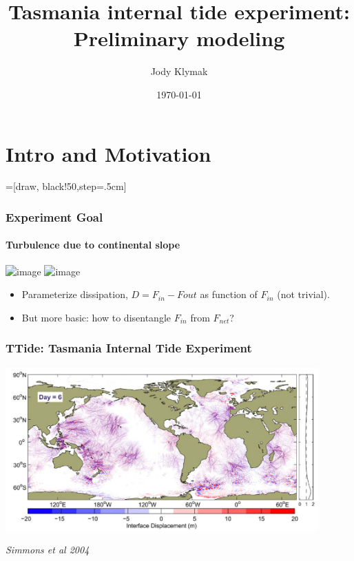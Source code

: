\documentclass[aspectratio=169]{beamer}
\title[TTide SIO 2015]{Tasmania internal tide experiment: Preliminary modeling}
\subtitle{}
\author{Jody Klymak}
\institute[UVic]{University of Victoria}
\date{\today}
\begin{document}
\frame{\titlepage}

\section{Intro and Motivation}
\def\tikzoverlay{%
   \tikz[baseline,overlay]\node[every overlay node]
}%


=[draw, black!50,step=.5cm]

\begin{frame}
  \frametitle{Experiment Goal}
  \framesubtitle{Turbulence due to continental slope}
  \includegraphics<1>[width=0.9\textwidth,trim=0 0 0 0, clip]{../writeups/Time11Annote.png}
  \includegraphics<2>[width=0.9\textwidth,trim=0 0 0 0, clip]{../writeups/Time11Annote2.png}
  
  \begin{itemize}
    \item<1->Parameterize dissipation, $D=F_{in}-F{out}$ as function of $F_{in}$ (not trivial).
    \item<2->But more basic: how to disentangle $F_{in}$ from $F_{net}$?  
  \end{itemize}
\end{frame}

\begin{frame}
  \frametitle{TTide: Tasmania Internal Tide Experiment}
  \includegraphics[width=0.9\textwidth]{doc/SimmonsEtAl04a.png}
  
  \emph{Simmons et al 2004}
\end{frame}
\end{document}
